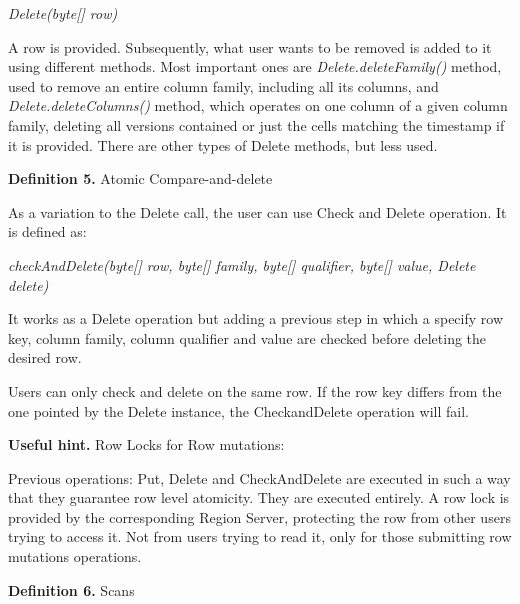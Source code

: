 \par
\bigskip
\centerline{\textit{Delete(byte[] row)}}
\bigskip

A row is provided. Subsequently, what user wants to be removed is added to it using different methods. Most important ones are \textit{Delete.deleteFamily()} method, used to remove an entire column family, including all its columns, and \textit{Delete.deleteColumns()} method, which operates on one column of a given column family, deleting all versions contained or just the cells matching the timestamp if it is provided. There are other types of Delete methods, but less used.

\bigskip
\textbf{Definition 5. }Atomic Compare-and-delete

As a variation to the Delete call, the user can use Check and Delete operation. It is defined as:

\par
\bigskip
\centerline{\textit{checkAndDelete(byte[] row, byte[] family, byte[] qualifier, byte[] value, Delete delete)}}
\bigskip

It works as a Delete operation but adding a previous step in which a specify row key, column family, column qualifier and value are checked before deleting the desired row.
\par
Users can only check and delete on the same row. If the row key differs from the one pointed by the Delete instance, the CheckandDelete operation will fail.

\par
\textbf{Useful hint. }Row Locks for Row mutations:

Previous operations: Put, Delete and CheckAndDelete are executed in such a way that they guarantee row level atomicity. They are executed entirely. A row lock is provided by the corresponding Region Server, protecting the row from other users trying to access it. Not from users trying to read it, only for those submitting row mutations operations.

\bigskip
\textbf{Definition 6. }Scans

